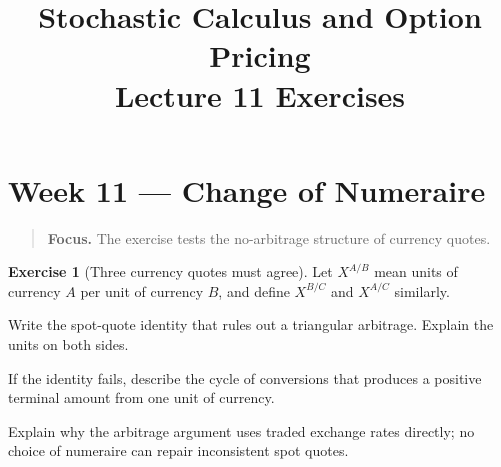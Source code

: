 \documentclass[11pt]{article}
\title{Stochastic Calculus and Option Pricing\\Lecture 11 Exercises}
\author{}
\date{}
\theoremstyle{definition}
\newtheorem{exercise}{Exercise}[section]
\newcommand{\lecturesummary}[1]{\begin{quote}\small\textbf{Focus.} #1\end{quote}}
\begin{document}
\maketitle
\vspace{-1.2em}
\setcounter{section}{10}
\fi

\section{Week 11 --- Change of Numeraire}
\lecturesummary{The exercise tests the no-arbitrage structure of currency
quotes.}


\begin{exercise}[Three currency quotes must agree]
Let \(X^{A/B}\) mean units of currency \(A\) per unit of currency \(B\), and
define \(X^{B/C}\) and \(X^{A/C}\) similarly.
\begin{exparts}
  \item Write the spot-quote identity that rules out a triangular arbitrage.
  Explain the units on both sides.
  \item If the identity fails, describe the cycle of conversions that
  produces a positive terminal amount from one unit of currency.
  \item Explain why the arbitrage argument uses traded exchange rates
  directly; no choice of numeraire can repair inconsistent spot quotes.
\end{exparts}
\end{exercise}

\ifdefined\ExercisesSynthesis\else
\end{document}
